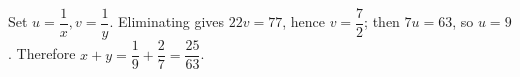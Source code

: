 Set $u=\dfrac{1}{x},v=\dfrac{1}{y}$. Eliminating gives $22v=77$, hence $v=\dfrac{7}{2}$; then $7u=63$, so $u=9$. Therefore $x+y=\dfrac{1}{9}+\dfrac{2}{7}=\boxed{\dfrac{25}{63}}$.
